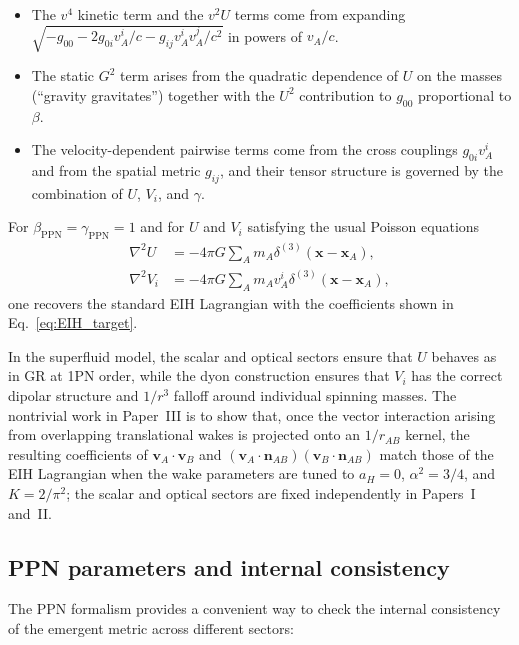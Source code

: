 \documentclass[11pt]{article}
\begin{document}
\begin{itemize}
  \item The $v^4$ kinetic term and the $v^2 U$ terms come from
        expanding $\sqrt{-g_{00} - 2 g_{0i} v_A^i/c - g_{ij}
        v_A^i v_A^j/c^2}$ in powers of $v_A/c$.
  \item The static $G^2$ term arises from the quadratic dependence
        of $U$ on the masses (``gravity gravitates'') together with
        the $U^2$ contribution to $g_{00}$ proportional to $\beta$.
  \item The velocity-dependent pairwise terms come from the cross
        couplings $g_{0i} v_A^i$ and from the spatial metric
        $g_{ij}$, and their tensor structure is governed by the
        combination of $U$, $V_i$, and $\gamma$.
\end{itemize}

For $\beta_{\mathrm{PPN}}=\gamma_{\mathrm{PPN}}=1$ and for $U$ and
$V_i$ satisfying the usual
Poisson equations
\begin{align}
  \nabla^2 U &= -4\pi G \sum_A m_A \delta^{(3)}(\mathbf{x}-\mathbf{x}_A),
  \\
  \nabla^2 V_i &= -4\pi G \sum_A m_A v_A^i
                     \delta^{(3)}(\mathbf{x}-\mathbf{x}_A),
\end{align}
one recovers the standard EIH Lagrangian with the coefficients shown
in Eq.~\eqref{eq:EIH_target}.

In the superfluid model, the scalar and optical sectors ensure that
$U$ behaves as in GR at 1PN order, while the dyon construction
ensures that $V_i$ has the correct dipolar structure and $1/r^3$
falloff around individual spinning masses.
The nontrivial work in Paper~III is to show that, once the vector
interaction arising from overlapping translational wakes is projected onto an
$1/r_{AB}$ kernel, the resulting coefficients of
$\mathbf{v}_A\cdot\mathbf{v}_B$ and
$(\mathbf{v}_A\cdot\mathbf{n}_{AB})(\mathbf{v}_B\cdot\mathbf{n}_{AB})$
match those of the EIH Lagrangian when the wake parameters are tuned to
$a_H=0$, $\alpha^2=3/4$, and $K=2/\pi^2$; the scalar and optical sectors are
fixed independently in Papers~I and~II.

\subsection{PPN parameters and internal consistency}

The PPN formalism provides a convenient way to check the internal
consistency of the emergent metric across different sectors:
\end{document}
